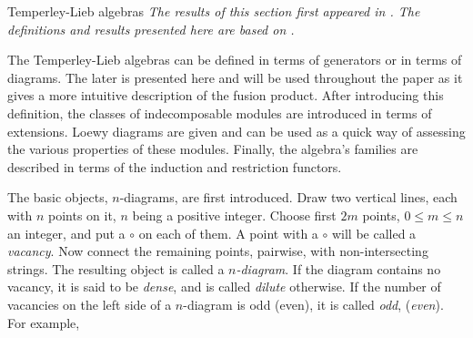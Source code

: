 \documentclass[reqno]{amsart}
\begin{document}
\begin{section}{Temperley-Lieb algebras}\label{sec:rappel_tl}
\emph{The results of this section first appeared in \cite{GoodmanWenzl,Martin,Westbury}. The definitions and results presented here are based on \cite{RiSY,BelSY,BelRiSy}.}

The Temperley-Lieb algebras can be defined in terms of generators or in terms of diagrams. The later is presented here and will be used throughout the paper as it gives a more intuitive description of the fusion product. After introducing this definition, the classes of indecomposable modules are introduced in terms of extensions. Loewy diagrams are given and can be used as a quick way of assessing the various properties of these modules. Finally, the algebra's families are described in terms of the induction and restriction functors.

The basic objects, $n$-diagrams, are first introduced. Draw two vertical lines, each with $n$ points on it, $n$ being a positive integer. Choose first $2m$ points, $0\leq m \leq n$ an integer, and put a $\circ$ on each of them. A point with a $\circ$ will be called a \emph{vacancy}. Now connect the remaining points, pairwise, with non-intersecting strings. The resulting object is called a {\em $n$-diagram}. If the diagram contains no vacancy, it is said to be \emph{dense}, and is called \emph{dilute} otherwise. If the number of vacancies on the left side of a $n$-diagram is odd (even), it is called \emph{odd}, (\emph{even}). For example,


\end{section}
\end{document}
